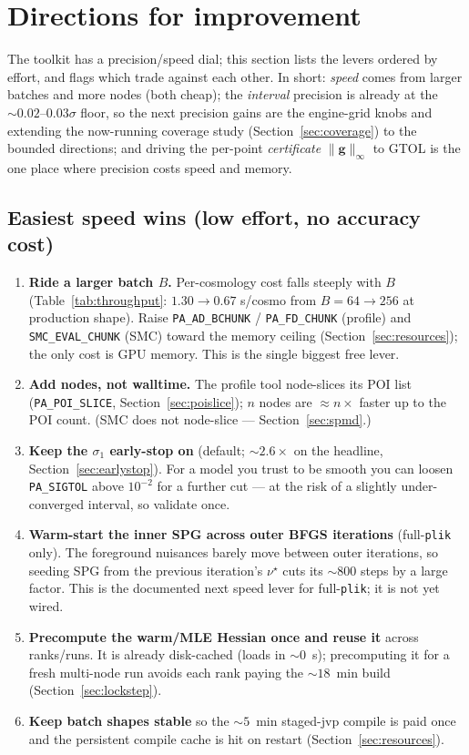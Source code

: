 \documentclass[11pt]{article}
\newcommand{\code}[1]{\texttt{\small #1}}
\newcommand{\ginf}{\lVert \bm{g}\rVert_\infty}
\begin{document}
\section{Directions for improvement}
\label{sec:improve}

The toolkit has a precision/speed dial; this section lists the levers
ordered by effort, and flags which trade against each other. In short:
\emph{speed} comes from larger batches and more nodes (both cheap);
the \emph{interval} precision is already at the $\sim0.02$--$0.03\sigma$
floor, so the next precision gains are the engine-grid knobs and extending
the now-running coverage study (Section~\ref{sec:coverage}) to the bounded
directions; and driving the per-point \emph{certificate} $\ginf$ to
GTOL is the one place where precision costs speed and memory.

\subsection{Easiest speed wins (low effort, no accuracy cost)}
\begin{enumerate}[leftmargin=2em,itemsep=2pt]
\item \textbf{Ride a larger batch $B$.} Per-cosmology cost falls steeply
with $B$ (Table~\ref{tab:throughput}: $1.30\to0.67$ s/cosmo from
$B=64\to256$ at production shape). Raise \code{PA\_AD\_BCHUNK} /
\code{PA\_FD\_CHUNK} (profile) and \code{SMC\_EVAL\_CHUNK} (SMC) toward the
memory ceiling (Section~\ref{sec:resources}); the only cost is GPU memory.
This is the single biggest free lever.
\item \textbf{Add nodes, not walltime.} The profile tool node-slices its
POI list (\code{PA\_POI\_SLICE}, Section~\ref{sec:poislice}); $n$ nodes are
$\approx n\times$ faster up to the POI count. (SMC does not node-slice ---
Section~\ref{sec:spmd}.)
\item \textbf{Keep the $\sigma_1$ early-stop on} (default;
$\sim2.6\times$ on the headline, Section~\ref{sec:earlystop}). For a model
you trust to be smooth you can loosen \code{PA\_SIGTOL} above $10^{-2}$ for a further
cut --- at the risk of a slightly under-converged interval, so validate
once.
\item \textbf{Warm-start the inner SPG across outer BFGS iterations}
(full-\code{plik} only). The foreground nuisances barely move between outer
iterations, so seeding SPG from the previous iteration's $\nu^\star$ cuts
its $\sim800$ steps by a large factor. This is the documented next speed
lever for full-\code{plik}; it is not yet wired.
\item \textbf{Precompute the warm/MLE Hessian once and reuse it} across
ranks/runs. It is already disk-cached (loads in $\sim0$~s); precomputing it
for a fresh multi-node run avoids each rank paying the $\sim18$~min build
(Section~\ref{sec:lockstep}).
\item \textbf{Keep batch shapes stable} so the $\sim5$~min staged-jvp
compile is paid once and the persistent compile cache is hit on restart
(Section~\ref{sec:resources}).
\end{enumerate}
\end{document}
